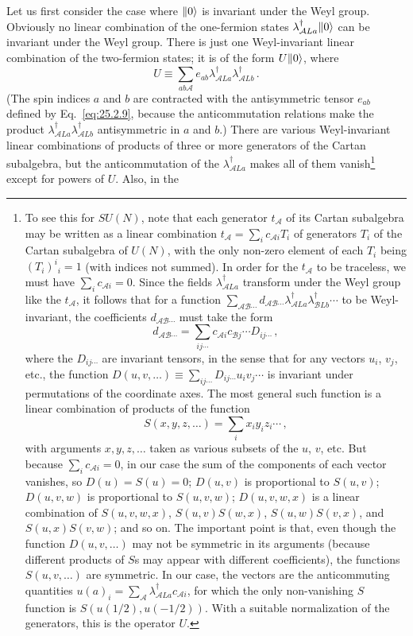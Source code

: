 Let us first consider the case where \(\lVert 0\rangle\) is invariant under the Weyl
group. Obviously no linear combination of the one-fermion states
\(\lambda_{\mathcal A La}^\dagger\lVert 0\rangle\) can be invariant under the Weyl group.
There is just one Weyl-invariant linear combination of the two-fermion
states; it is of the form \(U\lVert 0\rangle\), where
\begin{equation}
  U\equiv
  \sum_{ab\mathcal A}
  e_{ab}\lambda_{\mathcal A La}^\dagger
  \lambda_{\mathcal A Lb}^\dagger\,.
  \tag{29.4.12}\label{eq:29.4.12}
\end{equation}
(The spin indices \(a\) and \(b\) are contracted with the antisymmetric
tensor \(e_{ab}\) defined by Eq.~\eqref{eq:25.2.9}, because the
anticommutation relations make the product
\(\lambda_{\mathcal A La}^\dagger\lambda_{\mathcal A Lb}^\dagger\)
antisymmetric in
\(a\) and \(b\).) There are various Weyl-invariant linear combinations of
products of three or more generators of the Cartan subalgebra, but the
anticommutation of the \(\lambda_{\mathcal A La}^\dagger\) makes all of them
vanish\footnote{To see this for \(SU(N)\), note that each generator
\(t_{\mathcal A}\) of its Cartan subalgebra may be written as a linear
combination \(t_{\mathcal A}=\sum_i c_{\mathcal A i}T_i\) of generators
\(T_i\) of the Cartan subalgebra of \(U(N)\), with the only non-zero
element of each \(T_i\) being \((T_i)^i{}_i=1\) (with indices not summed).
In order for the \(t_{\mathcal A}\) to be traceless, we must have
\(\sum_i c_{\mathcal A i}=0\). Since the fields
\(\lambda_{\mathcal A La}^\dagger\) transform under the Weyl group like the
\(t_{\mathcal A}\), it follows that for a function
\(\sum_{\mathcal A\mathcal B\cdots}
d_{\mathcal A\mathcal B\cdots}
\lambda_{\mathcal A La}^\dagger\lambda_{\mathcal B Lb}^\dagger\cdots\)
to be
Weyl-invariant, the coefficients \(d_{\mathcal A\mathcal B\cdots}\) must
take the form
\[
  d_{\mathcal A\mathcal B\cdots}
  =
  \sum_{ij\cdots}
  c_{\mathcal A i}c_{\mathcal B j}\cdots D_{ij\cdots}\,,
\]
where the \(D_{ij\cdots}\) are invariant tensors, in the sense that for any
vectors \(u_i\), \(v_j\), etc., the function
\(D(u,v,\ldots)\equiv\sum_{ij\cdots}D_{ij\cdots}u_iv_j\cdots\) is
invariant under permutations of the coordinate axes. The most general such
function is a linear combination of products of the function
\[
  S(x,y,z,\ldots)=\sum_i x_i y_i z_i\cdots\,,
\]
with arguments \(x,y,z,\ldots\) taken as various subsets of the \(u\),
\(v\), etc. But because \(\sum_i c_{\mathcal A i}=0\), in our case the
sum of the components of each vector vanishes, so \(D(u)=S(u)=0\);
\(D(u,v)\) is proportional to \(S(u,v)\); \(D(u,v,w)\) is proportional to
\(S(u,v,w)\); \(D(u,v,w,x)\) is a linear combination of
\(S(u,v,w,x)\), \(S(u,v)S(w,x)\), \(S(u,w)S(v,x)\), and
\(S(u,x)S(v,w)\); and so on. The important point is that, even though the
function \(D(u,v,\ldots)\) may not be symmetric in its arguments (because
different products of \(S\)s may appear with different coefficients), the
functions \(S(u,v,\ldots)\) are symmetric. In our case, the vectors are
the anticommuting quantities
\(u(a)_i=\sum_{\mathcal A}
\lambda_{\mathcal A La}^\dagger c_{\mathcal A i}\),
for which the only non-vanishing \(S\) function is
\(S(u(1/2),u(-1/2))\). With a suitable normalization of the generators,
this is the operator \(U\).} except for powers of \(U\). Also, in the
